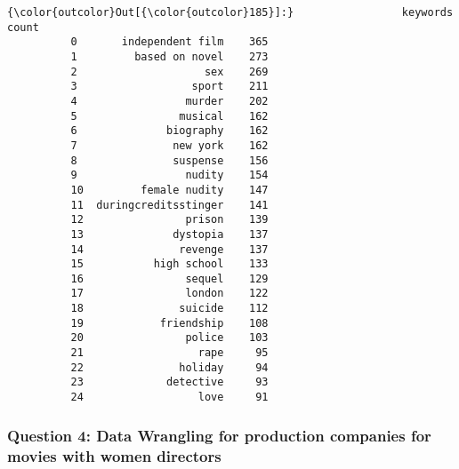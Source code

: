 \documentclass[11pt]{article}
\begin{document}
\begin{Verbatim}[commandchars=\\\{\}]
{\color{outcolor}Out[{\color{outcolor}185}]:}                 keywords  count
          0       independent film    365
          1         based on novel    273
          2                    sex    269
          3                  sport    211
          4                 murder    202
          5                musical    162
          6              biography    162
          7               new york    162
          8               suspense    156
          9                 nudity    154
          10         female nudity    147
          11  duringcreditsstinger    141
          12                prison    139
          13              dystopia    137
          14               revenge    137
          15           high school    133
          16                sequel    129
          17                london    122
          18               suicide    112
          19            friendship    108
          20                police    103
          21                  rape     95
          22               holiday     94
          23             detective     93
          24                  love     91
\end{Verbatim}
            
    \hypertarget{question-4-data-wrangling-for-production-companies-for-movies-with-women-directors}{%
\subsubsection{Question 4: Data Wrangling for production companies for
movies with women
directors}\label{question-4-data-wrangling-for-production-companies-for-movies-with-women-directors}}
\end{document}
